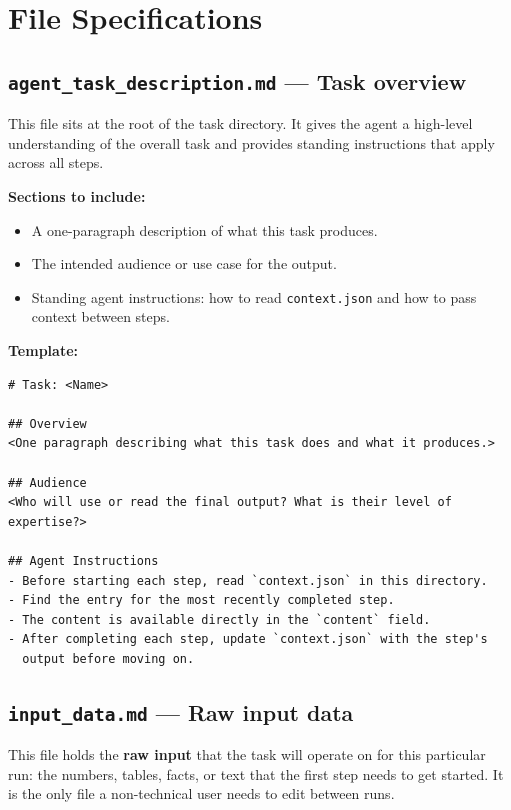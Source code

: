 \documentclass[12pt, a4paper]{article}
\begin{document}
\section{File Specifications}

\subsection{\texttt{agent\_task\_description.md} --- Task overview}

This file sits at the root of the task directory. It gives the agent a high-level understanding of the overall task and provides standing instructions that apply across all steps.

\textbf{Sections to include:}

\begin{itemize}[leftmargin=1.5em]
  \item A one-paragraph description of what this task produces.
  \item The intended audience or use case for the output.
  \item Standing agent instructions: how to read \texttt{context.json} and how to pass context between steps.
\end{itemize}

\textbf{Template:}

\begin{lstlisting}[language={}]
# Task: <Name>

## Overview
<One paragraph describing what this task does and what it produces.>

## Audience
<Who will use or read the final output? What is their level of expertise?>

## Agent Instructions
- Before starting each step, read `context.json` in this directory.
- Find the entry for the most recently completed step.
- The content is available directly in the `content` field.
- After completing each step, update `context.json` with the step's
  output before moving on.
\end{lstlisting}

\subsection{\texttt{input\_data.md} --- Raw input data}

This file holds the \textbf{raw input} that the task will operate on for this particular run: the numbers, tables, facts, or text that the first step needs to get started. It is the only file a non-technical user needs to edit between runs.
\end{document}
